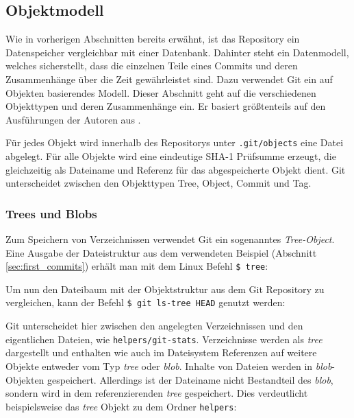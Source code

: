 \subsection{Objektmodell}\label{sec:objectmodel}
Wie in vorherigen Abschnitten bereits erwähnt, ist das Repository ein
Datenspeicher vergleichbar mit einer Datenbank. Dahinter steht ein Datenmodell,
welches sicherstellt, dass die einzelnen Teile eines Commits und deren
Zusammenhänge über die Zeit gewährleistet sind. Dazu verwendet Git ein auf
Objekten basierendes Modell. Dieser Abschnitt geht auf die verschiedenen
Objekttypen und deren Zusammenhänge ein. Er basiert größtenteils auf den
Ausführungen der Autoren aus \cite[S.~49-59]{gitosp}.

Für jedes Objekt wird innerhalb des Repositorys unter \texttt{.git/objects}
eine Datei abgelegt. Für alle Objekte wird eine eindeutige \gls{SHA-1}
Prüfsumme erzeugt, die gleichzeitig als Dateiname und Referenz für das
abgespeicherte Objekt dient. Git unterscheidet zwischen den Objekttypen Tree,
Object, Commit und Tag.

\subsubsection{Trees und Blobs}\label{sec:treeblobobjects}
Zum Speichern von Verzeichnissen verwendet Git ein sogenanntes
\textit{Tree-Object}. Eine Ausgabe der Dateistruktur aus dem verwendeten
Beispiel (Abschnitt \ref{sec:first_commits}) erhält man mit dem Linux Befehl
\texttt{\$ tree}:


Um nun den Dateibaum mit der Objektstruktur aus dem Git Repository zu
vergleichen, kann der Befehl \texttt{\$ git ls-tree HEAD} genutzt werden:


Git unterscheidet hier zwischen den angelegten Verzeichnissen und den
eigentlichen Dateien, wie \texttt{helpers/git-stats}. Verzeichnisse werden als
\textit{tree} dargestellt und enthalten wie auch im Dateisystem Referenzen auf
weitere Objekte entweder vom Typ \textit{tree} oder \textit{blob}.  Inhalte von
Dateien werden in \textit{blob}-Objekten gespeichert. Allerdings ist der
Dateiname nicht Bestandteil des \textit{blob}, sondern wird in dem
referenzierenden \textit{tree} gespeichert. Dies verdeutlicht beispielsweise
das \textit{tree} Objekt zu dem Ordner \texttt{helpers}:

